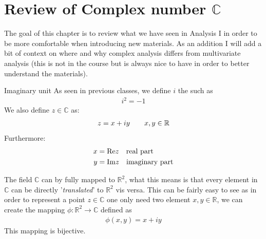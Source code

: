 
\chapter{Review of Complex number $\mathbb{C}$}
The goal of this chapter is to review what we have seen in Analysis I in order to be more comfortable when introducing new materials. As an addition I will add a bit of context on where and why complex analysis differs from multivariate analysis (this is not in the course but is always nice to have in order to better understand the materials).


\begin{parag}{Imaginary unit}
    As seen in previous classes, we define $i$ the  such as 
	\begin{align*} i^2 = -1 \end{align*}
	We also define $z \in \mathbb{C}$ as:
	\begin{align*} z = x + iy \quad \quad x, y \in \mathbb{R} \end{align*}
	Furthermore:
	\begin{align*} 
		x &= \text{Re}z \quad \text{real part}\\
		y &= \text{Im}z \quad \text{imaginary part}
	\end{align*}
\end{parag}
The field $\mathbb{C}$ can by fully mapped to $\mathbb{R}^2$, what this means is that every element in $\mathbb{C}$ can be directly '\textit{translated}' to $ \mathbb{R}^2$  vis versa. This can be fairly easy to see as in order to represent a point $z \in \mathbb{C}$ one only need two element $x, y \in \mathbb{R}$, we can create the mapping $\phi : \mathbb{R}^{2} \to \mathbb{C}$ defined as 
\begin{align*} 
	\phi\left(x, y\right) = x + iy
\end{align*}
This mapping is bijective.

